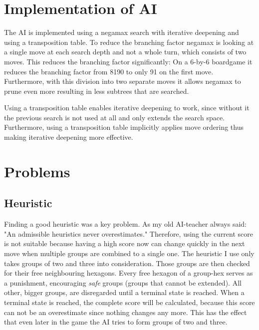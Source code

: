 \documentclass[a4paper]{article}
\begin{document}
\section{Implementation of AI}
The AI is implemented using a negamax search with iterative deepening and using a transposition table. To reduce the branching factor negamax is looking at a single move at each search depth and not a whole turn, which consists of two moves. This reduces the branching factor significantly: On a 6-by-6 boardgame it reduces the branching factor from 8190 to only 91 on the first move. Furthermore, with this division into two separate moves it allows negamax to prune even more resulting in less subtrees that are searched.

Using a transposition table enables iterative deepening to work, since without it the previous search is not used at all and only extends the search space. Furthermore, using a transposition table implicitly applies move ordering thus making iterative deepening more effective.

\section{Problems}
\subsection{Heuristic}
Finding a good heuristic was a key problem. As my old AI-teacher always said: "An admissible heuristics never overestimates." Therefore, using the current score is not suitable because having a high score now can change quickly in the next move when multiple groups are combined to a single one. The heuristic I use only takes groups of two and three into consideration. Those groups are then checked for their free neighbouring hexagons. Every free hexagon of a group-hex serves as a punishment, encouraging \textit{safe} groups (groups that cannot be extended). All other, bigger groups, are disregarded until a terminal state is reached. When a terminal state is reached, the complete score will be calculated, because this score can not be an overestimate since nothing changes any more. This has the effect that even later in the game the AI tries to form groups of two and three.
\end{document}
